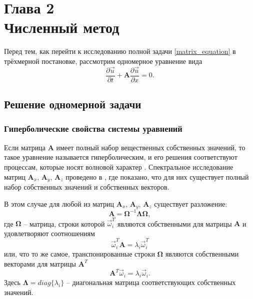 \section*{Глава 2\\Численный метод}
\setcounter{section}{2}
\setcounter{subsection}{0}

Перед тем, как перейти к исследованию полной задачи \eqref{matrix_equation} в трёхмерной постановке, рассмотрим одномерное уравнение вида
\begin{equation}
\frac{\partial\vec{u}}{\partial{t}}+\mathbf{A}\frac{\partial\vec{u}}{\partial{x}}=0.
\label{advection_equation}
\end{equation}

\subsection{Решение одномерной задачи}

\subsubsection{Гиперболические свойства системы уравнений}
\label{sec:hyperbolic_features}

Если матрица $\mathbf{A}$ имеет полный набор вещественных собственных значений, 
то такое уравнение называется гиперболическим, и его решения соответствуют 
процессам, которые носят волновой характер \cite{belocerkovsky, magomedov, chushkin}. Спектральное исследование матриц $\mathbf{A}_x$, $\mathbf{A}_y$, $\mathbf{A}_z$ проведено в \cite{chelnokov}, где показано, что для них существует полный набор собственных значений и собственных векторов.

В этом случае для любой из матриц $\mathbf{A}_x$, $\mathbf{A}_y$, $\mathbf{A}_z$ существует разложение:
\begin{equation}
\mathbf{A}=\mathbf\Omega^{-1}\mathbf\Lambda\mathbf\Omega,
\end{equation}
где $\mathbf\Omega$ -- матрица, строки которой $\vec\omega_i^T$ являются собственными для матрицы $\mathbf A$ и
удовлетворяют соотношениям
\begin{equation}
\vec\omega_i^T\mathbf A=\lambda_i\vec\omega_i^T
\end{equation}
или, что то же самое, транспонированные строки $\mathbf\Omega$ являются собственными векторами для матрицы $\mathbf A^T$
\begin{equation}
\mathbf A^T\vec\omega_i=\lambda_i\vec\omega_i.
\end{equation}
Здесь $\mathbf\Lambda=diag\{\lambda_i\}$ -- диагональная матрица соответствующих собственных значений.

